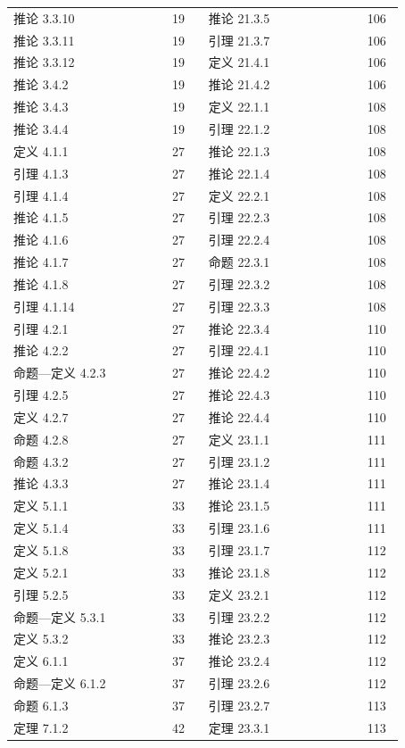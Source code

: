 \documentclass[UTF8,10pt,fontset=windows]{ctexart}
\begin{document}
{\begin{longtable}{@{}p{0.355\linewidth}p{0.085\linewidth}p{0.355\linewidth}p{0.085\linewidth}@{}}
推论 3.3.10 & 19 & 推论 21.3.5 & 106 \\
推论 3.3.11 & 19 & 引理 21.3.7 & 106 \\
推论 3.3.12 & 19 & 定义 21.4.1 & 106 \\
推论 3.4.2 & 19 & 推论 21.4.2 & 106 \\
推论 3.4.3 & 19 & 定义 22.1.1 & 108 \\
推论 3.4.4 & 19 & 引理 22.1.2 & 108 \\
定义 4.1.1 & 27 & 推论 22.1.3 & 108 \\
引理 4.1.3 & 27 & 推论 22.1.4 & 108 \\
引理 4.1.4 & 27 & 定义 22.2.1 & 108 \\
推论 4.1.5 & 27 & 引理 22.2.3 & 108 \\
推论 4.1.6 & 27 & 引理 22.2.4 & 108 \\
推论 4.1.7 & 27 & 命题 22.3.1 & 108 \\
推论 4.1.8 & 27 & 引理 22.3.2 & 108 \\
引理 4.1.14 & 27 & 引理 22.3.3 & 108 \\
引理 4.2.1 & 27 & 推论 22.3.4 & 110 \\
推论 4.2.2 & 27 & 引理 22.4.1 & 110 \\
命题—定义 4.2.3 & 27 & 推论 22.4.2 & 110 \\
引理 4.2.5 & 27 & 推论 22.4.3 & 110 \\
定义 4.2.7 & 27 & 推论 22.4.4 & 110 \\
命题 4.2.8 & 27 & 定义 23.1.1 & 111 \\
命题 4.3.2 & 27 & 引理 23.1.2 & 111 \\
推论 4.3.3 & 27 & 推论 23.1.4 & 111 \\
定义 5.1.1 & 33 & 推论 23.1.5 & 111 \\
定义 5.1.4 & 33 & 引理 23.1.6 & 111 \\
定义 5.1.8 & 33 & 引理 23.1.7 & 112 \\
定义 5.2.1 & 33 & 推论 23.1.8 & 112 \\
引理 5.2.5 & 33 & 定义 23.2.1 & 112 \\
命题—定义 5.3.1 & 33 & 引理 23.2.2 & 112 \\
定义 5.3.2 & 33 & 推论 23.2.3 & 112 \\
定义 6.1.1 & 37 & 推论 23.2.4 & 112 \\
命题—定义 6.1.2 & 37 & 引理 23.2.6 & 112 \\
命题 6.1.3 & 37 & 引理 23.2.7 & 113 \\
定理 7.1.2 & 42 & 定理 23.3.1 & 113 \\

\end{longtable}}
\end{document}
